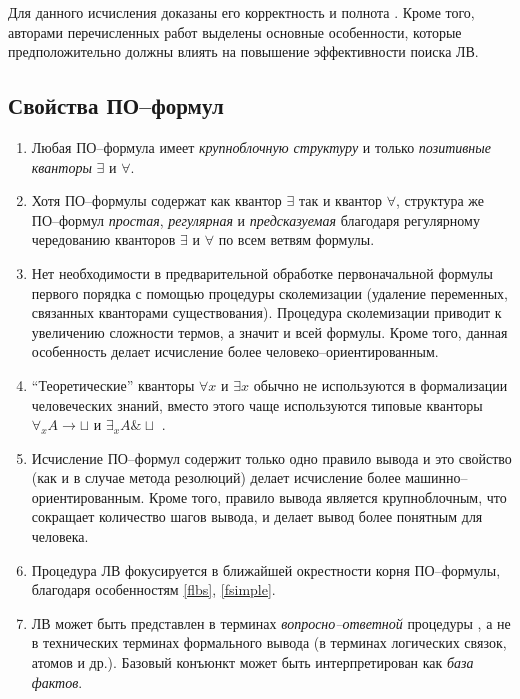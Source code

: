 Для данного исчисления доказаны его корректность и полнота \cite{ICDS2000, DavydovX}. Кроме того, авторами перечисленных работ выделены основные особенности, которые предположительно должны влиять на повышение эффективности поиска ЛВ.

\subsection{Свойства ПО--формул}

\begin{enumerate}
\item\label{flbs} Любая ПО--формула имеет {\em крупноблочную структуру} и только {\em позитивные кванторы} $\exists$ и $\forall$.
%
\item\label{fsimple} Хотя ПО--формулы содержат как квантор $\exists$ так и квантор $\forall$, структура же ПО--формул {\em простая}, {\em регулярная} и {\em предсказуемая} благодаря регулярному чередованию кванторов $\exists$ и $\forall$ по всем ветвям формулы.
%
\item Нет необходимости в предварительной обработке первоначальной формулы первого порядка с помощью процедуры сколемизации (удаление переменных, связанных кванторами существования). Процедура сколемизации приводит к увеличению сложности термов, а значит и всей формулы. Кроме того, данная особенность делает исчисление более человеко--ориентированным.
%
\item ``Теоретические'' кванторы $\forall x$ и $\exists x$ обычно не используются в формализации человеческих знаний, вместо этого чаще используются типовые кванторы $\forall_x A \rightarrow \sqcup$ и $\exists_x A \& \sqcup$ \cite{Bourbaki, ICDS2000, NNN}.
%
\item\label{frule} Исчисление ПО--формул содержит только одно правило вывода и это свойство (как и в случае метода резолюций) делает исчисление более машинно--ориентированным. Кроме того, правило вывода является крупноблочным, что сокращает количество шагов вывода, и делает вывод более понятным для человека.
%
\item\label{froot} Процедура ЛВ фокусируется в ближайшей окрестности корня ПО--фор\-му\-лы, благодаря особенностям \ref{flbs}, \ref{fsimple}.
%
\item\label{fqa} ЛВ может быть представлен в терминах {\em вопросно--ответной} процедуры \cite{ICDS2000}, а не в технических терминах формального вывода (в терминах логических связок, атомов и др.). Базовый конъюнкт может быть интерпретирован как {\em база фактов}.

\end{enumerate}
